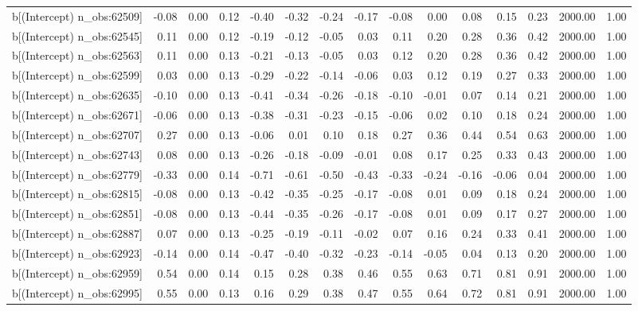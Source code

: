\begin{table}[ht]
\begin{tabular}{rrrrrrrrrrrrrrr}
  b[(Intercept) n\_obs:62509] & -0.08 & 0.00 & 0.12 & -0.40 & -0.32 & -0.24 & -0.17 & -0.08 & 0.00 & 0.08 & 0.15 & 0.23 & 2000.00 & 1.00 \\ 
  b[(Intercept) n\_obs:62545] & 0.11 & 0.00 & 0.12 & -0.19 & -0.12 & -0.05 & 0.03 & 0.11 & 0.20 & 0.28 & 0.36 & 0.42 & 2000.00 & 1.00 \\ 
  b[(Intercept) n\_obs:62563] & 0.11 & 0.00 & 0.13 & -0.21 & -0.13 & -0.05 & 0.03 & 0.12 & 0.20 & 0.28 & 0.36 & 0.42 & 2000.00 & 1.00 \\ 
  b[(Intercept) n\_obs:62599] & 0.03 & 0.00 & 0.13 & -0.29 & -0.22 & -0.14 & -0.06 & 0.03 & 0.12 & 0.19 & 0.27 & 0.33 & 2000.00 & 1.00 \\ 
  b[(Intercept) n\_obs:62635] & -0.10 & 0.00 & 0.13 & -0.41 & -0.34 & -0.26 & -0.18 & -0.10 & -0.01 & 0.07 & 0.14 & 0.21 & 2000.00 & 1.00 \\ 
  b[(Intercept) n\_obs:62671] & -0.06 & 0.00 & 0.13 & -0.38 & -0.31 & -0.23 & -0.15 & -0.06 & 0.02 & 0.10 & 0.18 & 0.24 & 2000.00 & 1.00 \\ 
  b[(Intercept) n\_obs:62707] & 0.27 & 0.00 & 0.13 & -0.06 & 0.01 & 0.10 & 0.18 & 0.27 & 0.36 & 0.44 & 0.54 & 0.63 & 2000.00 & 1.00 \\ 
  b[(Intercept) n\_obs:62743] & 0.08 & 0.00 & 0.13 & -0.26 & -0.18 & -0.09 & -0.01 & 0.08 & 0.17 & 0.25 & 0.33 & 0.43 & 2000.00 & 1.00 \\ 
  b[(Intercept) n\_obs:62779] & -0.33 & 0.00 & 0.14 & -0.71 & -0.61 & -0.50 & -0.43 & -0.33 & -0.24 & -0.16 & -0.06 & 0.04 & 2000.00 & 1.00 \\ 
  b[(Intercept) n\_obs:62815] & -0.08 & 0.00 & 0.13 & -0.42 & -0.35 & -0.25 & -0.17 & -0.08 & 0.01 & 0.09 & 0.18 & 0.24 & 2000.00 & 1.00 \\ 
  b[(Intercept) n\_obs:62851] & -0.08 & 0.00 & 0.13 & -0.44 & -0.35 & -0.26 & -0.17 & -0.08 & 0.01 & 0.09 & 0.17 & 0.27 & 2000.00 & 1.00 \\ 
  b[(Intercept) n\_obs:62887] & 0.07 & 0.00 & 0.13 & -0.25 & -0.19 & -0.11 & -0.02 & 0.07 & 0.16 & 0.24 & 0.33 & 0.41 & 2000.00 & 1.00 \\ 
  b[(Intercept) n\_obs:62923] & -0.14 & 0.00 & 0.14 & -0.47 & -0.40 & -0.32 & -0.23 & -0.14 & -0.05 & 0.04 & 0.13 & 0.20 & 2000.00 & 1.00 \\ 
  b[(Intercept) n\_obs:62959] & 0.54 & 0.00 & 0.14 & 0.15 & 0.28 & 0.38 & 0.46 & 0.55 & 0.63 & 0.71 & 0.81 & 0.91 & 2000.00 & 1.00 \\ 
  b[(Intercept) n\_obs:62995] & 0.55 & 0.00 & 0.13 & 0.16 & 0.29 & 0.38 & 0.47 & 0.55 & 0.64 & 0.72 & 0.81 & 0.91 & 2000.00 & 1.00 \\ 

\end{tabular}
\end{table}
